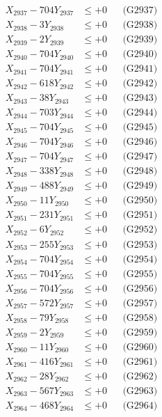 \documentclass[a4paper,10pt]{article}
\begin{document}
{\begin{align}
X_{2937} - 704Y_{2937} &\leq +0 && \text{(G2937)} \\
X_{2938} - 3Y_{2938} &\leq +0 && \text{(G2938)} \\
X_{2939} - 2Y_{2939} &\leq +0 && \text{(G2939)} \\
X_{2940} - 704Y_{2940} &\leq +0 && \text{(G2940)} \\
\allowbreak
X_{2941} - 704Y_{2941} &\leq +0 && \text{(G2941)} \\
X_{2942} - 618Y_{2942} &\leq +0 && \text{(G2942)} \\
X_{2943} - 38Y_{2943} &\leq +0 && \text{(G2943)} \\
X_{2944} - 703Y_{2944} &\leq +0 && \text{(G2944)} \\
X_{2945} - 704Y_{2945} &\leq +0 && \text{(G2945)} \\
X_{2946} - 704Y_{2946} &\leq +0 && \text{(G2946)} \\
X_{2947} - 704Y_{2947} &\leq +0 && \text{(G2947)} \\
X_{2948} - 338Y_{2948} &\leq +0 && \text{(G2948)} \\
X_{2949} - 488Y_{2949} &\leq +0 && \text{(G2949)} \\
X_{2950} - 11Y_{2950} &\leq +0 && \text{(G2950)} \\
\allowbreak
X_{2951} - 231Y_{2951} &\leq +0 && \text{(G2951)} \\
X_{2952} - 6Y_{2952} &\leq +0 && \text{(G2952)} \\
X_{2953} - 255Y_{2953} &\leq +0 && \text{(G2953)} \\
X_{2954} - 704Y_{2954} &\leq +0 && \text{(G2954)} \\
X_{2955} - 704Y_{2955} &\leq +0 && \text{(G2955)} \\
X_{2956} - 704Y_{2956} &\leq +0 && \text{(G2956)} \\
X_{2957} - 572Y_{2957} &\leq +0 && \text{(G2957)} \\
X_{2958} - 79Y_{2958} &\leq +0 && \text{(G2958)} \\
X_{2959} - 2Y_{2959} &\leq +0 && \text{(G2959)} \\
X_{2960} - 11Y_{2960} &\leq +0 && \text{(G2960)} \\
\allowbreak
X_{2961} - 416Y_{2961} &\leq +0 && \text{(G2961)} \\
X_{2962} - 28Y_{2962} &\leq +0 && \text{(G2962)} \\
X_{2963} - 567Y_{2963} &\leq +0 && \text{(G2963)} \\
X_{2964} - 468Y_{2964} &\leq +0 && \text{(G2964)} \\

\end{align}}
\end{document}

